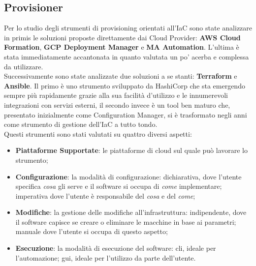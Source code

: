 \subsection{Provisioner}
Per lo studio degli strumenti di provisioning orientati all'IaC sono state analizzare in primis le soluzioni proposte direttamente dai Cloud Provider: \textbf{AWS Cloud Formation}, \textbf{GCP Deployment Manager} e \textbf{MA Automation}. L'ultima è stata immediatamente accantonata in quanto valutata un po' acerba e complessa da utilizzare. \\
Successivamente sono state analizzate due soluzioni a se stanti: \textbf{Terraform} e \textbf{Ansible}. Il primo è uno strumento sviluppato da HashiCorp che sta emergendo sempre più rapidamente grazie alla sua facilità d'utilizzo e le innumerevoli integrazioni con servizi esterni, il secondo invece è un tool ben maturo che, presentato inizialmente come Configuration Manager, si è trasformato negli anni come strumento di gestione dell'IaC a tutto tondo.\\
Questi strumenti sono stati valutati su quattro diversi aspetti:
\begin{itemize}
	\item \textbf{Piattaforme Supportate}: le piattaforme di cloud sul quale può lavorare lo strumento;
	\item \textbf{Configurazione}: la modalità di configurazione: dichiarativa, dove l'utente specifica \textit{cosa} gli serve e il software si occupa di \textit{come} implementare; imperativa dove l'utente è responsabile del \textit{cosa} e del \textit{come};
	\item \textbf{Modifiche}: la gestione delle modifiche all'infrastruttura: indipendente, dove il software capisce se creare o eliminare le macchine in base ai parametri; manuale dove l'utente si occupa di questo aspetto;
	\item \textbf{Esecuzione}: la modalità di esecuzione del software: \gls{cli}, ideale per l'automazione; \gls{gui}, ideale per l'utilizzo da parte dell'utente.
\end{itemize}

